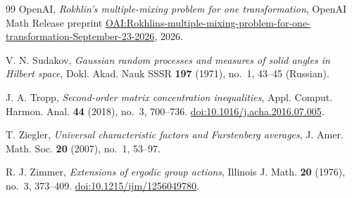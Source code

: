 \begin{thebibliography}{99}
OpenAI,
\emph{Rokhlin's multiple-mixing problem for one transformation},
OpenAI Math Release preprint
\href{https://github.com/openai/math/blob/main/preprints/Rokhlins-multiple-mixing-problem-for-one-transformation-September-23-2026/paper.pdf}{OAI:Rokhlins-multiple-mixing-problem-for-one-transformation-September-23-2026},
2026.

V. N. Sudakov,
\emph{Gaussian random processes and measures of solid angles in Hilbert space},
Dokl. Akad. Nauk SSSR \textbf{197} (1971), no.~1, 43--45 (Russian).

J. A. Tropp,
\emph{Second-order matrix concentration inequalities},
Appl. Comput. Harmon. Anal. \textbf{44} (2018), no.~3, 700--736.
\href{https://doi.org/10.1016/j.acha.2016.07.005}{doi:10.1016/j.acha.2016.07.005}.

T. Ziegler,
\emph{Universal characteristic factors and Furstenberg averages},
J. Amer. Math. Soc. \textbf{20} (2007), no.~1, 53--97.

R. J. Zimmer,
\emph{Extensions of ergodic group actions},
Illinois J. Math. \textbf{20} (1976), no.~3, 373--409.
\href{https://doi.org/10.1215/ijm/1256049780}{doi:10.1215/ijm/1256049780}.

\end{thebibliography}
